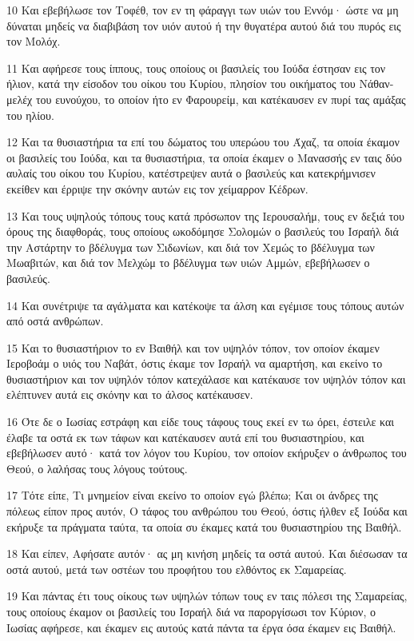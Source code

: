 \par 10 Και εβεβήλωσε τον Τοφέθ, τον εν τη φάραγγι των υιών του Εννόμ· ώστε να μη δύναται μηδείς να διαβιβάση τον υιόν αυτού ή την θυγατέρα αυτού διά του πυρός εις τον Μολόχ.
\par 11 Και αφήρεσε τους ίππους, τους οποίους οι βασιλείς του Ιούδα έστησαν εις τον ήλιον, κατά την είσοδον του οίκου του Κυρίου, πλησίον του οικήματος του Νάθαν-μελέχ του ευνούχου, το οποίον ήτο εν Φαρουρείμ, και κατέκαυσεν εν πυρί τας αμάξας του ηλίου.
\par 12 Και τα θυσιαστήρια τα επί του δώματος του υπερώου του Άχαζ, τα οποία έκαμον οι βασιλείς του Ιούδα, και τα θυσιαστήρια, τα οποία έκαμεν ο Μανασσής εν ταις δύο αυλαίς του οίκου του Κυρίου, κατέστρεψεν αυτά ο βασιλεύς και κατεκρήμνισεν εκείθεν και έρριψε την σκόνην αυτών εις τον χείμαρρον Κέδρων.
\par 13 Και τους υψηλούς τόπους τους κατά πρόσωπον της Ιερουσαλήμ, τους εν δεξιά του όρους της διαφθοράς, τους οποίους ωκοδόμησε Σολομών ο βασιλεύς του Ισραήλ διά την Αστάρτην το βδέλυγμα των Σιδωνίων, και διά τον Χεμώς το βδέλυγμα των Μωαβιτών, και διά τον Μελχώμ το βδέλυγμα των υιών Αμμών, εβεβήλωσεν ο βασιλεύς.
\par 14 Και συνέτριψε τα αγάλματα και κατέκοψε τα άλση και εγέμισε τους τόπους αυτών από οστά ανθρώπων.
\par 15 Και το θυσιαστήριον το εν Βαιθήλ και τον υψηλόν τόπον, τον οποίον έκαμεν Ιεροβοάμ ο υιός του Ναβάτ, όστις έκαμε τον Ισραήλ να αμαρτήση, και εκείνο το θυσιαστήριον και τον υψηλόν τόπον κατεχάλασε και κατέκαυσε τον υψηλόν τόπον και ελέπτυνεν αυτά εις σκόνην και το άλσος κατέκαυσεν.
\par 16 Ότε δε ο Ιωσίας εστράφη και είδε τους τάφους τους εκεί εν τω όρει, έστειλε και έλαβε τα οστά εκ των τάφων και κατέκαυσεν αυτά επί του θυσιαστηρίου, και εβεβήλωσεν αυτό· κατά τον λόγον του Κυρίου, τον οποίον εκήρυξεν ο άνθρωπος του Θεού, ο λαλήσας τους λόγους τούτους.
\par 17 Τότε είπε, Τι μνημείον είναι εκείνο το οποίον εγώ βλέπω; Και οι άνδρες της πόλεως είπον προς αυτόν, Ο τάφος του ανθρώπου του Θεού, όστις ήλθεν εξ Ιούδα και εκήρυξε τα πράγματα ταύτα, τα οποία συ έκαμες κατά του θυσιαστηρίου της Βαιθήλ.
\par 18 Και είπεν, Αφήσατε αυτόν· ας μη κινήση μηδείς τα οστά αυτού. Και διέσωσαν τα οστά αυτού, μετά των οστέων του προφήτου του ελθόντος εκ Σαμαρείας.
\par 19 Και πάντας έτι τους οίκους των υψηλών τόπων τους εν ταις πόλεσι της Σαμαρείας, τους οποίους έκαμον οι βασιλείς του Ισραήλ διά να παροργίσωσι τον Κύριον, ο Ιωσίας αφήρεσε, και έκαμεν εις αυτούς κατά πάντα τα έργα όσα έκαμεν εις Βαιθήλ.
